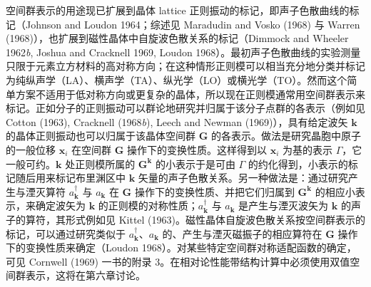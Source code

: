 空间群表示的用途现已扩展到晶体 lattice 正则振动的标记，即声子色散曲线的标记（Johnson and Loudon 1964；综述见 Maradudin and Vosko (1968) 与 Warren (1968)），也扩展到磁性晶体中自旋波色散关系的标记（Dimmock and Wheeler 1962\textit{b}, Joshua and Cracknell 1969, Loudon 1968）。最初声子色散曲线的实验测量只限于元素立方材料的高对称方向；在这种情形正则模可以相当充分地分类并标记为纯纵声学（LA）、横声学（TA）、纵光学（LO）或横光学（TO）。然而这个简单方案不适用于低对称方向或更复杂的晶体，所以现在正则模通常用空间群表示来标记。正如分子的正则振动可以群论地研究并归属于该分子点群的各表示（例如见 Cotton (1963), Cracknell (1968\textit{b}), Leech and Newman (1969)），具有给定波矢 $\mathbf{k}$ 的晶体正则振动也可以归属于该晶体空间群 $\mathbf{G}$ 的各表示。做法是研究晶胞中原子的一般位移 $\mathbf{x}_{i}$ 在空间群 $\mathbf{G}$ 操作下的变换性质。这样得到以 $\mathbf{x}_{i}$ 为基的表示 $\Gamma$，它一般可约。$\mathbf{k}$ 处正则模所属的 $\mathbf{G}^{\mathbf{k}}$ 的小表示于是可由 $\Gamma$ 的约化得到，小表示的标记随后用来标记布里渊区中 $\mathbf{k}$ 矢量的声子色散关系。另一种做法是：通过研究产生与湮灭算符 $a^{\dagger}_{\mathbf{k}}$ 与 $a_{\mathbf{k}}$ 在 $\mathbf{G}$ 操作下的变换性质、并把它们归属到 $\mathbf{G}^{\mathbf{k}}$ 的相应小表示，来确定波矢为 $\mathbf{k}$ 的正则模的对称性质；$a^{\dagger}_{\mathbf{k}}$ 与 $a_{\mathbf{k}}$ 是产生与湮灭波矢为 $\mathbf{k}$ 的声子的算符，其形式例如见 Kittel (1963)。磁性晶体自旋波色散关系按空间群表示的标记，可以通过研究类似于 $a^{\dagger}_{\mathbf{k}}$、$a_{\mathbf{k}}$ 的、产生与湮灭磁振子的相应算符在 $\mathbf{G}$ 操作下的变换性质来确定（Loudon 1968）。对某些特定空间群对称适配函数的确定，可见 Cornwell (1969) 一书的附录 3。在相对论性能带结构计算中必须使用双值空间群表示，这将在第六章讨论。
